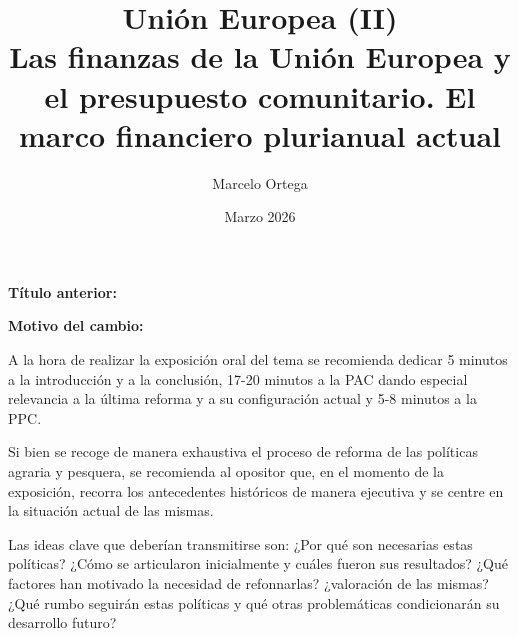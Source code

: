 \documentclass[10pt,a4paper]{article}
\title{Unión Europea (II)\\
\large Las finanzas de la Unión Europea y el presupuesto comunitario. El marco financiero plurianual actual}
\author{Marcelo Ortega}
\date{Marzo 2026}
\newcommand{\puntosclave}[1]{%
  \begin{tcolorbox}[
    colframe=black,
    title={Puntos clave},
    before upper={\setlength{\parindent}{0.5cm}\setlength{\parskip}{0.5\baselineskip}}
  ]
  #1
  \end{tcolorbox}
}
\newcommand{\changebox}{%
\begin{tcolorbox}[title={Historial de cambios del tema}]
\textbf{Título anterior:} \OldTitle\par
\textbf{Motivo del cambio:} \ChangeWhy
\end{tcolorbox}
}
\begin{document}
\maketitle
\changebox

\newpage

\puntosclave{ %
     A la hora de realizar la exposición oral del tema se recomienda dedicar 5 minutos a la introducción y a la conclusión, 17-20 minutos a la PAC dando especial relevancia a la última reforma y a su configuración actual y 5-8 minutos a la PPC.

     Si bien se recoge de manera exhaustiva el proceso de reforma de las políticas agraria y pesquera, se recomienda al opositor que, en el momento de la exposición, recorra los antecedentes históricos de manera ejecutiva y se centre en la situación actual de las mismas.

     Las ideas clave que deberían transmitirse son: ¿Por qué son necesarias estas políticas? ¿Cómo se articularon inicialmente y cuáles fueron sus resultados? ¿Qué factores han motivado la necesidad de refonnarlas? ¿valoración de las mismas? ¿Qué rumbo seguirán estas políticas y qué otras problemáticas condicionarán su desarrollo futuro?
    }
\vspace{1cm}
\end{document}
